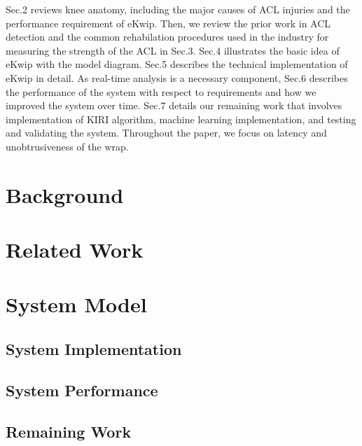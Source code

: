 \documentclass{sig-alternate}
\begin{document}
Sec.2 reviews knee anatomy, including the major causes of ACL injuries and the performance requirement of eKwip. Then, we review the prior work in ACL detection and the common rehabilation procedures used in the industry for measuring the strength of the ACL in Sec.3. Sec.4 illustrates the basic idea of eKwip with the model diagram. Sec.5 describes the technical implementation of eKwip in detail. As real-time analysis is a necessary component, Sec.6 describes the performance of the system with respect to requirements and how we improved the system over time. Sec.7 details our remaining work that involves implementation of KIRI algorithm, machine learning implementation, and testing and validating the system. Throughout the paper, we focus on latency and unobtrusiveness of the wrap.

\section{Background}
\label{sec:background}


\section{Related Work}
\label{sec:related_work}


\section{System Model}
\label{sec:system_model}


\subsection{System Implementation}
\label{subsec:system_implementation}


\subsection{System Performance}
\label{subsec:system_performance}


\subsection{Remaining Work}
\label{subsec:remaining_work}


\end{document}
